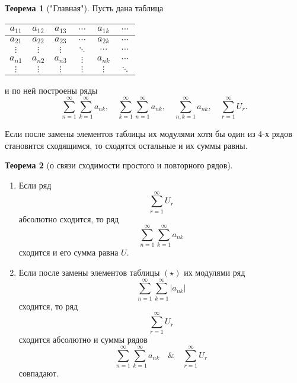 \documentclass{report}
\theoremstyle{definition}
\newtheorem{theorem}{Теорема}[section]
\begin{document}
\begin{theorem}["Главная"]
  Пусть дана таблица
  \begin{center}
    \begin{tabular}{c | c | c | c | c | c}
      $a_{11}$ & $a_{12}$ & $a_{13}$ & $\cdots$ & $a_{1k}$ & $\cdots$ \\
      \hline
      $a_{21}$ & $a_{22}$ & $a_{23}$ & $\cdots$ & $a_{2k}$ & $\cdots$ \\
      \hline
      $\vdots$ & $\vdots$ & $\vdots$ & $\ddots$ & $\cdots$ & $\cdots$ \\
      \hline
      $a_{n1}$ & $a_{n2}$ & $a_{n3}$ & $\vdots$ & $a_{nk}$ & $\cdots$ \\
      \hline
      $\vdots$ & $\vdots$ & $\vdots$ & $\vdots$ & $\vdots$ & $\ddots$ \\
    \end{tabular}
  \end{center}
  и по ней построены ряды
  \begin{equation*}
    \sum_{n=1}^{\infty}\sum_{k=1}^{\infty}a_{nk}, \quad \sum_{k=1}^{\infty}\sum_{n=1}^{\infty}a_{nk}, \quad \sum_{n,k = 1}^{\infty} a_{nk}, \quad \sum_{r=1}^{\infty}U_r.
  \end{equation*}

  Если после замены элементов таблицы их модулями хотя бы один из 4-х рядов становится сходящимся, то сходятся остальные и их суммы равны.
\end{theorem}

\begin{theorem}[о связи сходимости простого и повторного рядов]
  \begin{enumerate}
    \item Если ряд
          \begin{equation*}
            \sum_{r=1}^{\infty}U_r
          \end{equation*}
          абсолютно сходится, то ряд
          \begin{equation*}
            \sum_{n=1}^{\infty}\sum_{k=1}^{\infty}a_{nk}
          \end{equation*}
          сходится и его сумма равна $U$.

    \item Если после замены элементов таблицы $(\star)$ их модулями ряд
          \begin{equation*}
            \sum_{n=1}^{\infty}\sum_{k=1}^{\infty}|a_{nk}|
          \end{equation*}
          сходится, то ряд
          \begin{equation*}
            \sum_{r=1}^{\infty}U_r
          \end{equation*}
          сходится абсолютно и суммы рядов
          \begin{equation*}
            \sum_{n=1}^{\infty}\sum_{k=1}^{\infty}a_{nk} \quad \& \quad \sum_{r=1}^{\infty}U_r
          \end{equation*}
          совпадают.
  \end{enumerate}
\end{theorem}
\end{document}
